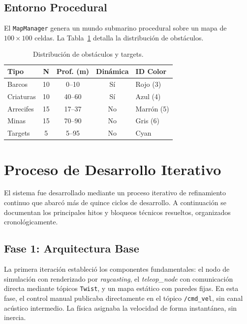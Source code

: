 \documentclass[10pt,twocolumn,letterpaper]{article}
\begin{document}
\subsection{Entorno Procedural}

El \texttt{MapManager} genera un mundo submarino procedural sobre un mapa de $100 \times 100$ celdas. La Tabla~\ref{tab:obstacles} detalla la distribución de obstáculos.

\begin{table}[H]
\centering
\caption{Distribución de obstáculos y targets.}
\label{tab:obstacles}
\scriptsize
\begin{tabular}{@{}lcccl@{}}
\toprule
\textbf{Tipo} & \textbf{N} & \textbf{Prof. (m)} & \textbf{Dinámica} & \textbf{ID Color} \\
\midrule
Barcos & 10 & 0--10 & Sí & Rojo (3) \\
Criaturas & 10 & 40--60 & Sí & Azul (4) \\
Arrecifes & 15 & 17--37 & No & Marrón (5) \\
Minas & 15 & 70--90 & No & Gris (6) \\
Targets & 5 & 5--95 & No & Cyan \\
\bottomrule
\end{tabular}
\end{table}

\section{Proceso de Desarrollo Iterativo}
\label{sec:desarrollo}

El sistema fue desarrollado mediante un proceso iterativo de refinamiento continuo que abarcó más de quince ciclos de desarrollo. A continuación se documentan los principales hitos y bloqueos técnicos resueltos, organizados cronológicamente.

\subsection{Fase 1: Arquitectura Base}

La primera iteración estableció los componentes fundamentales: el nodo de simulación con renderizado por \textit{raycasting}, el \textit{teleop\_node} con comunicación directa mediante tópicos \texttt{Twist}, y un mapa estático con paredes fijas. En esta fase, el control manual publicaba directamente en el tópico \texttt{/cmd\_vel}, sin canal acústico intermedio. La física asignaba la velocidad de forma instantánea, sin inercia.
\end{document}
